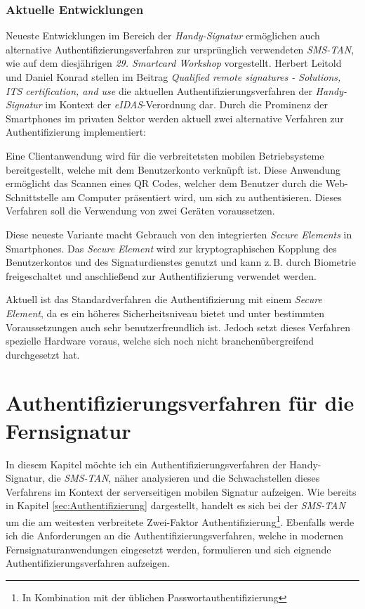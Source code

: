 \documentclass[11pt,a4paper,ngerman]{scrreprt}
\begin{document}
\subsection{Aktuelle Entwicklungen}\label{sec:scWorkshop}
Neueste Entwicklungen im Bereich der \textit{Handy-Signatur} ermöglichen auch alternative Authentifizierungsverfahren zur ursprünglich verwendeten \textit{SMS-TAN}, wie auf dem diesjährigen \textit{29. Smartcard Workshop} vorgestellt. Herbert Leitold und Daniel Konrad stellen im Beitrag \textit{Qualified remote signatures - Solutions, ITS certification, and use} \cite{scWorkshop} die aktuellen Authentifizierungsverfahren der \textit{Handy-Signatur} im Kontext der \textit{eIDAS}-Verordnung dar. Durch die Prominenz der Smartphones im privaten Sektor werden aktuell zwei alternative Verfahren zur Authentifizierung implementiert:
\begin{description}[font=\rmfamily]
    \item[OTP mit QR Code] Eine Clientanwendung wird für die verbreitetsten mobilen Betriebsysteme bereitgestellt, welche mit dem Benutzerkonto verknüpft ist. Diese Anwendung ermöglicht das Scannen eines QR Codes, welcher dem Benutzer durch die Web-Schnittstelle am Computer präsentiert wird, um sich zu authentisieren. Dieses Verfahren soll die Verwendung von zwei Geräten voraussetzen.
    \item[Secure Hardware Element (SE)] Diese neueste Variante macht Gebrauch von den integrierten \textit{Secure Elements} in Smartphones. Das \textit{Secure Element} wird zur kryptographischen Kopplung des Benutzerkontos und des Signaturdienstes genutzt und kann z.\,B. durch Biometrie freigeschaltet und anschließend zur Authentifizierung verwendet werden.
\end{description}
Aktuell ist das Standardverfahren die Authentifizierung mit einem \textit{Secure Element}, da es ein höheres Sicherheitsniveau bietet und unter bestimmten Voraussetzungen auch sehr benutzerfreundlich ist. Jedoch setzt dieses Verfahren spezielle Hardware voraus, welche sich noch nicht branchenübergreifend durchgesetzt hat.

\chapter{Authentifizierungsverfahren für die Fernsignatur}\label{sec:fernSignAuth}
In diesem Kapitel möchte ich ein Authentifizierungsverfahren der Handy-Signatur, die \textit{SMS-TAN}, näher analysieren und die Schwachstellen dieses Verfahrens im Kontext der serverseitigen mobilen Signatur aufzeigen. Wie bereits in Kapitel \ref{sec:Authentifizierung} dargestellt, handelt es sich bei der \textit{SMS-TAN} um die am weitesten verbreitete Zwei-Faktor Authentifizierung\footnote{In Kombination mit der üblichen Passwortauthentifizierung}. Ebenfalls werde ich die Anforderungen an die Authentifizierungsverfahren, welche in modernen Fernsignaturanwendungen eingesetzt werden, formulieren und sich eignende Authentifizierungsverfahren aufzeigen.
\end{document}
